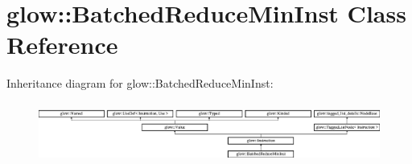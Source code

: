 \hypertarget{classglow_1_1_batched_reduce_min_inst}{}\section{glow\+:\+:Batched\+Reduce\+Min\+Inst Class Reference}
\label{classglow_1_1_batched_reduce_min_inst}
Inheritance diagram for glow\+:\+:Batched\+Reduce\+Min\+Inst\+:\begin{figure}[H]
\begin{center}
\leavevmode
\includegraphics[height=1.991111cm]{classglow_1_1_batched_reduce_min_inst}
\end{center}
\end{figure}
